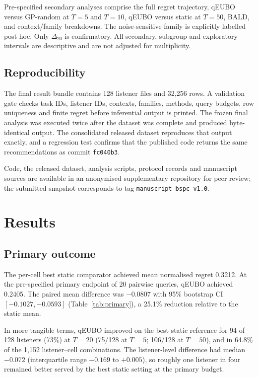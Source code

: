 \documentclass[preprint,12pt]{elsarticle}
\begin{document}
Pre-specified secondary analyses comprise the full regret trajectory, qEUBO versus GP-random at $T=5$ and $T=10$, qEUBO versus static at $T=50$, BALD, and context/family breakdowns. The noise-sensitive family is explicitly labelled post-hoc. Only $\Delta_{20}$ is confirmatory. All secondary, subgroup and exploratory intervals are descriptive and are not adjusted for multiplicity.

\subsection{Reproducibility}
\label{sec:repro}

The final result bundle contains 128 listener files and 32,256 rows. A validation gate checks task IDs, listener IDs, contexts, families, methods, query budgets, row uniqueness and finite regret before inferential output is printed. The frozen final analysis was executed twice after the dataset was complete and produced byte-identical output. The consolidated released dataset reproduces that output exactly, and a regression test confirms that the published code returns the same recommendations as commit \texttt{fc040b3}.

Code, the released dataset, analysis scripts, protocol records and manuscript sources are available in an anonymised supplementary repository for peer review; the submitted snapshot corresponds to tag \texttt{manuscript-bspc-v1.0}.

\section{Results}
\label{sec:results}

\subsection{Primary outcome}

The per-cell best static comparator achieved mean normalised regret 0.3212. At the pre-specified primary endpoint of 20 pairwise queries, qEUBO achieved 0.2405. The paired mean difference was $-0.0807$ with 95\% bootstrap CI $[-0.1027,-0.0593]$ (Table~\ref{tab:primary}), a 25.1\% reduction relative to the static mean.

In more tangible terms, qEUBO improved on the best static reference for 94 of 128 listeners (73\%) at $T=20$ (75/128 at $T=5$; 106/128 at $T=50$), and in 64.8\% of the 1,152 listener--cell combinations. The listener-level difference had median $-0.072$ (interquartile range $-0.169$ to $+0.005$), so roughly one listener in four remained better served by the best static setting at the primary budget.
\end{document}
